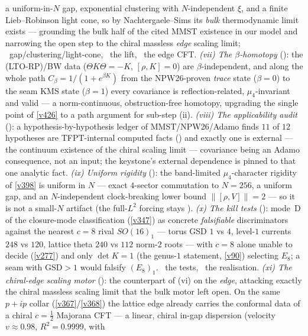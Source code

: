 \documentclass[11pt,a4paper]{article}
\begin{document}
\begin{keybox}
a uniform-in-$N$ gap, exponential clustering with $N$-independent $\xi$, and a finite Lieb--Robinson light cone, so
by Nachtergaele--Sims its \emph{bulk} thermodynamic limit exists --- grounding the bulk half of the cited MMST
existence in our model and narrowing the open step to the chiral massless \emph{edge} scaling limit;
\mE\ gap/clustering/light-cone, \mC\ the lift, \mO\ the edge CFT. \emph{(vii) The $\beta$-homotopy}
(): the (LTO-RP)/BW data ($\Theta K\Theta{=}{-}K$, $[\rho,K]{=}0$) are
$\beta$-independent, and along the whole path $C_\beta{=}1/(1{+}e^{\beta K})$ from the NPW26-proven \emph{trace}
state ($\beta{=}0$) to the seam KMS state ($\beta{=}1$) every covariance is reflection-related, $\mu_4$-invariant
and valid --- a norm-continuous, obstruction-free homotopy, upgrading the single point of \vref{v426} to a path
argument for sub-step (ii). \emph{(viii) The applicability audit} ():
a hypothesis-by-hypothesis ledger of MMST/NPW26/Adamo finds $11$ of $12$ hypotheses are TFPT-internal computed
facts (\mE) and exactly one is external --- the continuum existence of the chiral scaling limit ---
covariance being an Adamo consequence, not an input; the keystone's external dependence is pinned to that one
analytic fact. \emph{(ix) Uniform rigidity} (): the band-limited
$\mu_4$-character rigidity of \vref{v398} is uniform in $N$ --- exact $4$-sector commutation to $N{=}256$, a
uniform gap, and an $N$-independent clock-breaking lower bound $\|[\rho,V]\|{=}2$ --- so it is not a small-$N$
artifact (the full-$L^2$ forcing stays \mO). \emph{(x) The kill tests} ():
mode~D of the closure-mode classification (\vref{v347}) as concrete \emph{falsifiable} discriminators against the
nearest $c{=}8$ rival $SO(16)_1$ --- torus GSD $1$ vs $4$, level-$1$ currents $248$ vs $120$, lattice theta $240$
vs $112$ norm-$2$ roots --- with $c{=}8$ alone unable to decide (\vref{v277}) and only $\det K{=}1$ (the genus-$1$
statement, \vref{v90}) selecting $E_8$; a seam with GSD${>}1$ would falsify $(E_8)_1$. \mX\ the tests, \mO\ the
realisation. \emph{(xi) The chiral-edge scaling motor} (): the counterpart of
(vi) on the \emph{edge}, attacking exactly the chiral massless scaling limit that the bulk motor left open. On the
same $p{+}ip$ collar (\vref{v367}/\vref{v368}) the lattice edge already carries the conformal data of a chiral
$c{=}\tfrac12$ Majorana CFT --- a linear, chiral in-gap dispersion (velocity $v{\approx}0.98$, $R^2{=}0.9999$, with

\end{keybox}
\end{document}
